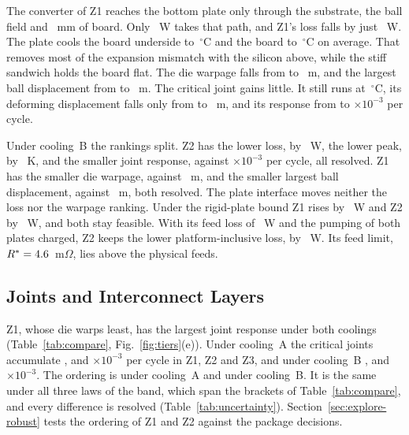 The converter of Z1 reaches the bottom plate only through the substrate, the ball field and
\FrBoardMm~mm of board. Only \QbotBZone~W takes that path, and Z1's loss falls by just
\GainBZone~W. The plate cools the board underside to \TboardBotBZone\,$^\circ$C and the board to
\TboardBZone\,$^\circ$C on average. That removes most of the expansion mismatch with the silicon
above, while the stiff sandwich holds the board flat. The die warpage falls from \WarpAZone{} to
\WarpBZone~\textmu m, and the largest ball displacement from \DuAZone{} to \DuBZone~\textmu m. The
critical joint gains little. It still runs at \MvTsjBZone\,$^\circ$C, its deforming displacement
falls only from \MvDudefAZone{} to \MvDudefBZone~\textmu m, and its response from \MvEpsAZone{} to
\MvEpsBZone$\times10^{-3}$ per cycle.

Under cooling~B the rankings split. Z2 has the lower loss, by \GapBZtwo~W, the lower peak, by
\dTmaxTierBZtwo~K, and the smaller joint response, \MvEpsBZtwo{} against
\MvEpsBZone$\times10^{-3}$ per cycle, all resolved. Z1 has the smaller die warpage, \WarpBZone{}
against \WarpBZtwo~\textmu m, and the smaller largest ball displacement, \DuBZone{} against
\DuBZtwo~\textmu m, both resolved. The plate interface moves neither the loss nor the warpage
ranking. Under the rigid-plate bound Z1 rises by \FbBZonedP~W and Z2 by \FbBZtwodP~W, and both stay
feasible. With its feed loss of \PlatFeedBZtwo~W and the pumping of both plates charged, Z2 keeps the
lower platform-inclusive loss, by \WrPlatGapB~W. Its feed limit, $R^* = 4.6$~m$\Omega$,
lies above the physical feeds.

\subsection{Joints and Interconnect Layers}\label{sec:compare-joints}
Z1, whose die warps least, has the largest joint response under both coolings
(Table~\ref{tab:compare}, Fig.~\ref{fig:tiers}(e)). Under cooling~A the critical joints accumulate
\MvEpsAZone, \MvEpsAZtwo{} and \MvEpsAZthree$\times10^{-3}$ per cycle in Z1, Z2 and Z3, and under
cooling~B \MvEpsBZone, \MvEpsBZtwo{} and \MvEpsBZthree$\times10^{-3}$. The ordering is \MvEpsOrderA{}
under cooling~A and \MvEpsOrderB{} under cooling~B. It is the same under all three laws of the band,
which span the brackets of Table~\ref{tab:compare}, and every difference is resolved
(Table~\ref{tab:uncertainty}). Section~\ref{sec:explore-robust} tests the ordering of Z1 and Z2
against the package decisions.

